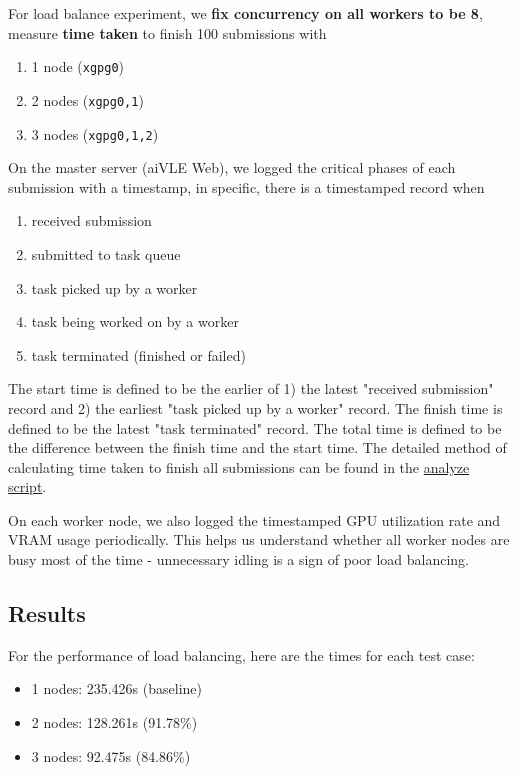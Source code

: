 \documentclass[fyp]{socreport}
\begin{document}
For load balance experiment, we \textbf{fix concurrency on all workers to be 8}, measure \textbf{time taken} to finish 100 submissions with
\begin{enumerate}
    \item 1 node (\texttt{xgpg0})
    \item 2 nodes (\texttt{xgpg0,1})
    \item 3 nodes (\texttt{xgpg0,1,2})
\end{enumerate}

On the master server (aiVLE Web), we logged the critical phases of each submission with a timestamp, in specific, there is a timestamped record when
\begin{enumerate}
    \item received submission
    \item submitted to task queue
    \item task picked up by a worker
    \item task being worked on by a worker
    \item task terminated (finished or failed)
\end{enumerate}

The start time is defined to be the earlier of 1) the latest "received submission" record and 2) the earliest "task picked up by a worker" record. The finish time is defined to be the latest "task terminated" record. The total time is defined to be the difference between the finish time and the start time. The detailed method of calculating time taken to finish all submissions can be found in the \href{https://github.com/edu-ai/aivle-experiment-logs/blob/main/web/analyze.ipynb}{analyze script}.

On each worker node, we also logged the timestamped GPU utilization rate and VRAM usage periodically. This helps us understand whether all worker nodes are busy most of the time - unnecessary idling is a sign of poor load balancing.

\subsection{Results}

For the performance of load balancing, here are the times for each test case:
\begin{itemize}
    \item 1 nodes: 235.426s (baseline)
    \item 2 nodes: 128.261s (91.78\%)
    \item 3 nodes: 92.475s (84.86\%)
\end{itemize}
\end{document}
